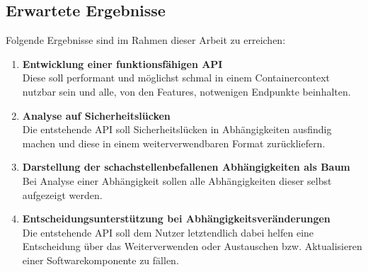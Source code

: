 \subsection{Erwartete Ergebnisse} \label{sec:Erwartete Ergebnisse}
Folgende Ergebnisse sind im Rahmen dieser Arbeit zu erreichen:
\begin{enumerate}
    \item \textbf{Entwicklung einer funktionsfähigen API} \\
        Diese soll performant und möglichst schmal in einem Containercontext nutzbar sein und alle, von den Features, notwenigen Endpunkte beinhalten.
    \item \textbf{Analyse auf Sicherheitslücken} \\
        Die entstehende API soll Sicherheitslücken in Abhängigkeiten ausfindig machen und diese in einem weiterverwendbaren Format zurückliefern.
    \item \textbf{Darstellung der schachstellenbefallenen Abhängigkeiten als Baum} \\
        Bei Analyse einer Abhängigkeit sollen alle Abhängigkeiten dieser selbst aufgezeigt werden.
    \item \textbf{Entscheidungsunterstützung bei Abhängigkeitsveränderungen} \\
        Die entstehende API soll dem Nutzer letztendlich dabei helfen eine Entscheidung über das Weiterverwenden oder Austauschen bzw. Aktualisieren einer Softwarekomponente zu fällen.
\end{enumerate}